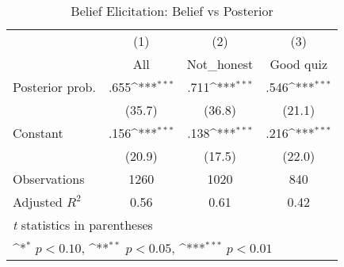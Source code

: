 \begin{table}[htbp]\centering
\def\sym#1{\ifmmode^{#1}\else\(^{#1}\)\fi}
\caption{Belief Elicitation: Belief vs Posterior}
\begin{tabular}{l*{3}{c}}
\hline\hline
                &\multicolumn{1}{c}{(1)}&\multicolumn{1}{c}{(2)}&\multicolumn{1}{c}{(3)}\\
                &\multicolumn{1}{c}{All}&\multicolumn{1}{c}{Not\_honest}&\multicolumn{1}{c}{Good quiz}\\
\hline
Posterior prob. &     .655\sym{***}&     .711\sym{***}&     .546\sym{***}\\
                &   (35.7)         &   (36.8)         &   (21.1)         \\
Constant        &     .156\sym{***}&     .138\sym{***}&     .216\sym{***}\\
                &   (20.9)         &   (17.5)         &   (22.0)         \\
\hline
Observations    &     1260         &     1020         &      840         \\
Adjusted \(R^{2}\)&     0.56         &     0.61         &     0.42         \\
\hline\hline
\multicolumn{4}{l}{\footnotesize \textit{t} statistics in parentheses}\\
\multicolumn{4}{l}{\footnotesize \sym{*} \(p<0.10\), \sym{**} \(p<0.05\), \sym{***} \(p<0.01\)}\\
\end{tabular}
\end{table}
